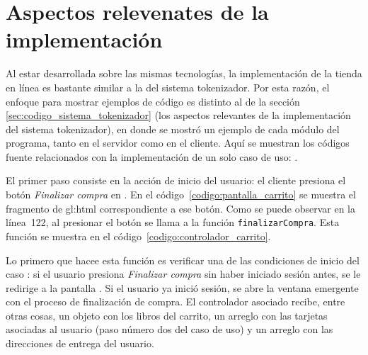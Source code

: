 %
%

\section{Aspectos relevenates de la implementación}

Al estar desarrollada sobre las mismas tecnologías, la implementación de la
tienda en línea es bastante similar a la del sistema tokenizador. Por esta
razón, el enfoque para mostrar ejemplos de código es distinto al de la sección
\ref{sec:codigo_sistema_tokenizador} (los aspectos relevantes de la
implementación del sistema tokenizador), en donde se mostró un ejemplo de cada
módulo del programa, tanto en el servidor como en el cliente. Aquí se muestran
los códigos fuente relacionados con la implementación de un solo caso de uso:
.

El primer paso consiste en la acción de inicio del usuario: el cliente presiona
el botón \textit{Finalizar compra} en .
En el código~\ref{codigo:pantalla_carrito} se muestra el fragmento de
\gls{gl:html} correspondiente a ese botón. Como se puede observar en la
línea~122, al presionar el botón se llama a la función \texttt{finalizarCompra}.
Esta función se muestra en el código~\ref{codigo:controlador_carrito}.



Lo primero que hacee esta función es verificar una de las condiciones de inicio
del caso : si el usuario presiona
\textit{Finalizar compra} sin haber iniciado sesión antes, se le redirige a la
pantalla . Si el usuario ya inició sesión,
se abre la ventana emergente con el proceso de finalización de compra. El
controlador asociado recibe, entre otras cosas, un objeto con los libros del
carrito, un arreglo con las tarjetas asociadas al usuario (paso número dos del
caso de uso) y un arreglo con las direcciones de entrega del usuario.
